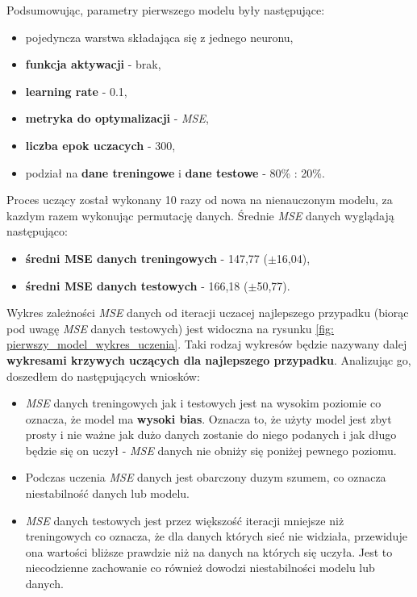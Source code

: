 \documentclass[12pt]{aghdpl}
\begin{document}
		Podsumowując, parametry pierwszego modelu były następujące:
		\begin{itemize}
		\item pojedyncza warstwa składająca się z jednego neuronu,
		\item \textbf{funkcja aktywacji} - brak,
		\item \textbf{learning rate} - 0.1,
		\item \textbf{metryka do optymalizacji} - \textit{MSE},
		\item \textbf{liczba epok uczacych} - 300,
		\item podział na \textbf{dane treningowe} i \textbf{dane testowe} - 80\% : 20\%.
		\end{itemize}
				
		Proces uczący został wykonany 10 razy od nowa na nienauczonym modelu, za kazdym razem wykonując permutację danych. Średnie \textit{MSE} danych wyglądają następująco:
		\begin{itemize}
		\item \textbf{średni MSE danych treningowych} - 147,77 ($\pm$16,04),
		\item \textbf{średni MSE danych testowych} - 166,18 ($\pm$50,77).
		\end{itemize}
		Wykres zależności \textit{MSE} danych od iteracji uczacej najlepszego przypadku (biorąc pod uwagę \textit{MSE} danych testowych) jest widoczna na rysunku \ref{fig: pierwszy_model_wykres_uczenia}. Taki rodzaj wykresów będzie nazywany dalej \textbf{wykresami krzywych uczących dla najlepszego przypadku}. Analizując go, doszedłem do następujących wniosków:
		\begin{itemize}
		\item \textit{MSE} danych treningowych jak i testowych jest na wysokim poziomie co oznacza, że model ma \textbf{wysoki bias}. Oznacza to, że użyty model jest zbyt prosty i nie ważne jak dużo danych zostanie do niego podanych i jak długo będzie się on uczył - \textit{MSE} danych nie obniży się poniżej pewnego poziomu.
		\item Podczas uczenia \textit{MSE} danych jest obarczony duzym szumem, co oznacza niestabilność danych lub modelu.
		\item \textit{MSE} danych testowych jest przez większość iteracji mniejsze niż treningowych co oznacza, że dla danych których sieć nie widziała, przewiduje ona wartości bliższe prawdzie niż na danych na których się uczyła. Jest to niecodzienne zachowanie co również dowodzi niestabilności modelu lub danych.
		\end{itemize}
		
\end{document}
